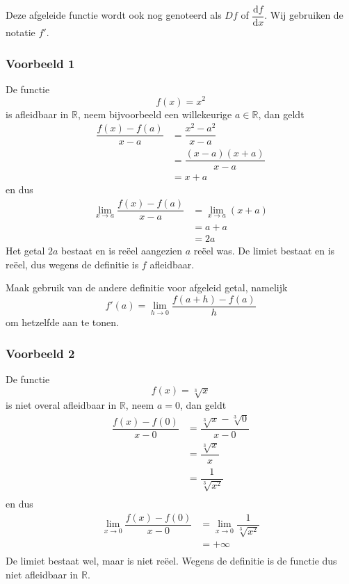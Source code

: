 \documentclass[12pt]{article}
\begin{document}
Deze afgeleide functie wordt ook nog genoteerd als $Df$ of $\dfrac{\mbox{d}f}{\mbox{d}x}$. Wij gebruiken de notatie $f'$.

\subsubsection*{Voorbeeld 1}

De functie
$$f(x)=x^2$$
is afleidbaar in $\mathbb{R}$, neem bijvoorbeeld een willekeurige $a\in\mathbb{R}$, dan geldt
\begin{align*}
  \dfrac{f(x)-f(a)}{x-a} &= \dfrac{x^2-a^2}{x-a}\\
                         &= \dfrac{(x-a)(x+a)}{x-a}\\
                         &= x+a
\end{align*}
en dus
\begin{align*}
  \lim_{x\to a}\dfrac{f(x)-f(a)}{x-a} &= \lim_{x\to a}(x+a)\\
                                      &= a+a\\
                                      &= 2a
\end{align*}
Het getal $2a$ bestaat en is reëel aangezien $a$ reëel was. De limiet bestaat en is reëel, dus wegens de definitie is $f$ afleidbaar.

\begin{oefening}
  Maak gebruik van de andere definitie voor afgeleid getal, namelijk $$f'(a)=\lim_{h\to 0}\dfrac{f(a+h)-f(a)}{h}$$ om hetzelfde aan te tonen.
\end{oefening}

\subsubsection*{Voorbeeld 2}

De functie
$$f(x)=\sqrt[3]{x}$$
is niet overal afleidbaar in $\mathbb{R}$, neem $a=0$, dan geldt
\begin{align*}
  \dfrac{f(x)-f(0)}{x-0} &= \dfrac{\sqrt[3]{x}-\sqrt[3]{0}}{x-0}\\
                         &= \dfrac{\sqrt[3]{x}}{x}\\
                         &= \dfrac{1}{\sqrt[3]{x^2}}\\
\end{align*}
en dus
\begin{align*}
  \lim_{x\to 0}\dfrac{f(x)-f(0)}{x-0} &= \lim_{x\to 0}\dfrac{1}{\sqrt[3]{x^2}}\\
                                      &= +\infty\\
\end{align*}
De limiet bestaat wel, maar is niet reëel. Wegens de definitie is de functie dus niet afleidbaar in $\mathbb{R}$.
\end{document}
